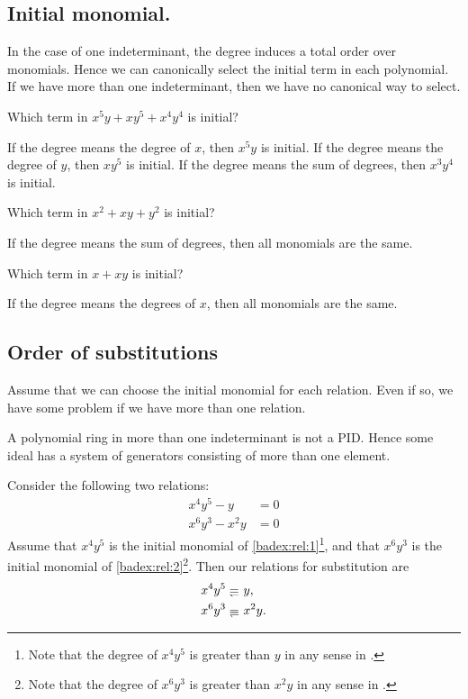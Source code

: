 \subsection{Initial monomial.}
In the case of one indeterminant,
the degree induces a total order over monomials.
Hence we can canonically select the initial term in each polynomial.
If we have more than one indeterminant,
then we have no canonical way to select.
\begin{example}
  \label{ex:degree}
  Which term in $x^5y+xy^5+x^4y^4$ is initial?

  If the degree means the degree of $x$,
  then $x^5y$ is initial.
  If the degree means the degree of $y$,
  then $xy^5$ is initial.
  If the degree means the sum of degrees,
  then $x^3y^4$ is initial.  
\end{example}


\begin{example}
  Which term in $x^2+xy+y^2$ is initial?

  If the degree means the sum of degrees,
  then all monomials are the same.
\end{example}

\begin{example}
  Which term in $x+xy$ is initial?

  If the degree means the degrees of $x$,
  then all monomials are the same.
\end{example}



\subsection{Order of substitutions}
Assume that we can choose the initial monomial for each relation.
Even if so,
we have some problem if we have more than one relation.

\begin{remark}
    A polynomial ring in more than one indeterminant is not a PID.
    Hence some ideal has a system of generators consisting of
    more than one element.
\end{remark}



Consider the following two relations:
\begin{align}
x^4y^5-y&=0 \label{badex:rel:1}\\
x^6y^3-x^2y&=0 \label{badex:rel:2}   
\end{align}
Assume that
$x^4y^5$ is the initial monomial of \cref{badex:rel:1}\footnote{Note that the degree of $x^4y^5$ is greater than $y$ in any sense in .},
and that
$x^6y^3$ is the initial monomial of \cref{badex:rel:2}\footnote{Note that the degree of $x^6y^3$ is greater than $x^2y$ in any sense in .}.
Then
our relations for substitution are
\begin{align}
x^4y^5&\denotes y, \label{badex:relsub:1}\\
x^6y^3&\denotes x^2y. \label{badex:relsub:2}   
\end{align}


